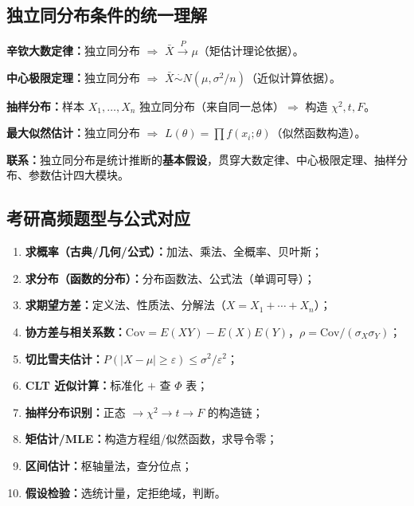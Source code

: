 \documentclass[11pt,a4paper]{article}
\begin{document}
\subsection{独立同分布条件的统一理解}

\begin{variation}[独立同分布的应用场景]
\textbf{辛钦大数定律：}独立同分布 $\Rightarrow$ $\bar X\xrightarrow{P}\mu$（矩估计理论依据）。

\textbf{中心极限定理：}独立同分布 $\Rightarrow$ $\bar X\overset{\cdot}{\sim}N(\mu,\sigma^2/n)$（近似计算依据）。

\textbf{抽样分布：}样本 $X_1,\dots,X_n$ 独立同分布（来自同一总体）$\Rightarrow$ 构造 $\chi^2,t,F$。

\textbf{最大似然估计：}独立同分布 $\Rightarrow$ $L(\theta)=\prod f(x_i;\theta)$（似然函数构造）。

\textbf{联系：}独立同分布是统计推断的\textbf{基本假设}，贯穿大数定律、中心极限定理、抽样分布、参数估计四大模块。
\end{variation}

\subsection{考研高频题型与公式对应}

\begin{examtip}[高频题型公式速查]
\begin{enumerate}[leftmargin=2em]
  \item \textbf{求概率（古典/几何/公式）：}加法、乘法、全概率、贝叶斯；
  \item \textbf{求分布（函数的分布）：}分布函数法、公式法（单调可导）；
  \item \textbf{求期望方差：}定义法、性质法、分解法（$X=X_1+\cdots+X_n$）；
  \item \textbf{协方差与相关系数：}$\mathrm{Cov}=E(XY)-E(X)E(Y)$，$\rho=\mathrm{Cov}/(\sigma_X\sigma_Y)$；
  \item \textbf{切比雪夫估计：}$P(|X-\mu|\geq\varepsilon)\leq \sigma^2/\varepsilon^2$；
  \item \textbf{CLT 近似计算：}标准化 $+$ 查 $\Phi$ 表；
  \item \textbf{抽样分布识别：}正态 $\to\chi^2\to t\to F$ 的构造链；
  \item \textbf{矩估计/MLE：}构造方程组/似然函数，求导令零；
  \item \textbf{区间估计：}枢轴量法，查分位点；
  \item \textbf{假设检验：}选统计量，定拒绝域，判断。
\end{enumerate}
\end{examtip}
\end{document}
